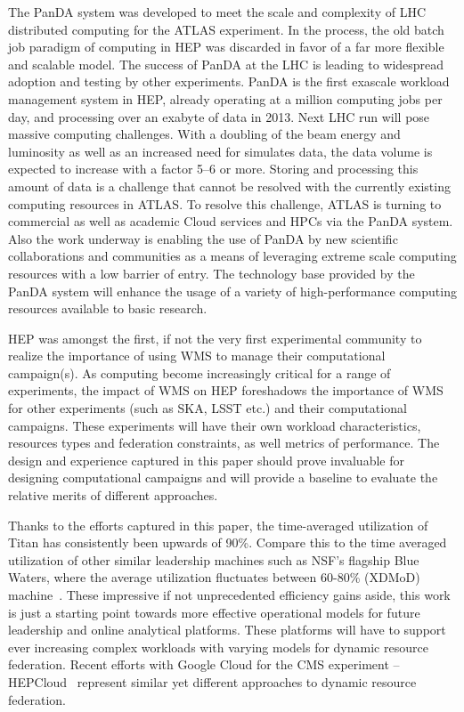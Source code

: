 The PanDA  system was developed to meet the scale and complexity of LHC
distributed computing for the ATLAS experiment.  In the process,  the old batch
job paradigm  of computing in HEP was  discarded  in favor of a  far more
flexible and scalable  model. The success  of PanDA  at the LHC is leading to
widespread adoption and testing by other experiments. PanDA  is the first
exascale  workload management system in HEP, already operating at a million
computing jobs per day, and processing over an exabyte of data in 2013. Next LHC
run will pose massive computing  challenges. With a  doubling of the beam
energy  and luminosity as  well as an increased  need for  simulates  data, the
data volume is expected to increase with a factor 5--6 or more. Storing and
processing  this amount of data is a  challenge   that cannot be resolved with
the currently existing  computing  resources in ATLAS\@. To resolve this
challenge, ATLAS is turning to commercial  as well as academic Cloud services
and HPCs via the PanDA system. Also the work underway is enabling the use of
PanDA by new scientific collaborations and communities as a means  of leveraging
extreme scale computing  resources with a low barrier of entry. The technology
base provided by the PanDA system will enhance the usage of a variety  of
high-performance computing resources available to basic research.

HEP was amongst the first, if not the very first experimental community to
realize the importance of using WMS to manage their computational campaign(s).
As computing become increasingly critical for a range of experiments, the
impact of WMS on HEP foreshadows the importance of WMS for other experiments
(such as SKA, LSST etc.) and their computational campaigns. These experiments
will have their own workload characteristics, resources types and federation
constraints, as well metrics of performance.  The design and experience
captured in this paper should prove invaluable for designing computational
campaigns and will provide a baseline to evaluate the relative merits of
different approaches.

Thanks to the efforts captured in this paper, the time-averaged utilization of
Titan has consistently been upwards of 90\%. Compare this to the time averaged
utilization of other similar leadership machines such as NSF's flagship Blue
Waters, where the average utilization fluctuates between 60-80\% (XDMoD)
machine~\cite{bw-sucks}. These impressive if not unprecedented efficiency
gains aside, this work is just a starting point towards more effective
operational models for future leadership and online analytical platforms\cite
{foap-url}. These platforms will have to support ever increasing complex
workloads with varying models for dynamic resource federation. Recent efforts
with Google Cloud for the CMS experiment -- HEPCloud~\cite{hepcloud,google-
hep} represent similar yet different approaches to dynamic resource
federation.

